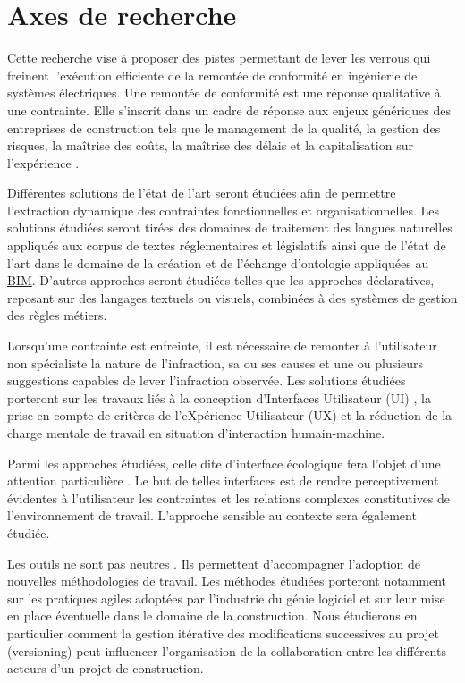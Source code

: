 \documentclass[a4paper,12pt]{article}
\begin{document}
\section{Axes de recherche}
\label{sec:org7d35508}
Cette recherche vise à proposer des pistes permettant de lever les verrous qui freinent l'exécution efficiente de la remontée de conformité en ingénierie de systèmes électriques. Une remontée de conformité est une réponse qualitative à une contrainte. Elle s’inscrit dans un cadre de réponse aux enjeux génériques des entreprises de construction tels que le management de la qualité, la gestion des risques, la maîtrise des coûts, la maîtrise des délais et la capitalisation sur l’expérience \autocite{ManagementProjetProgramme2017}.

Différentes solutions de l'état de l’art seront étudiées afin de permettre l’extraction dynamique des contraintes fonctionnelles et organisationnelles. Les solutions étudiées seront tirées des domaines de traitement des langues naturelles appliqués aux corpus de textes réglementaires et législatifs ainsi que de l'état de l’art dans le domaine de la création et de l’échange d’ontologie appliquées au \protect\hyperlink{gls-1}{\label{gls-1-use-10}BIM}. D’autres approches seront étudiées telles que les approches déclaratives, reposant sur des langages textuels ou visuels, combinées à des systèmes de gestion des règles métiers.

Lorsqu’une contrainte est enfreinte, il est nécessaire de remonter à l'utilisateur non spécialiste la nature de l’infraction, sa ou ses causes et une ou plusieurs suggestions capables de lever l’infraction observée. Les solutions étudiées porteront sur les travaux liés à la conception d’Interfaces Utilisateur (UI) \autocite{Shneiderman2016}, la prise en compte de critères de l’eXpérience Utilisateur (UX) \autocite{Nogier2020} et la réduction de la charge mentale de travail \autocite{longoHumanMentalWorkload2022a,morayMentalWorkloadIts1979a} en situation d’interaction humain-machine. 

Parmi les approches étudiées, celle dite d'interface écologique fera l’objet d’une attention particulière \autocite{Burns2004,vicenteEcologicalInterfaceDesign1992b}. Le but de telles interfaces est de rendre perceptivement évidentes à l'utilisateur les contraintes et les relations complexes constitutives de l’environnement de travail. L’approche sensible au contexte \autocite{deyUnderstandingUsingContext2001a} sera également étudiée.

Les outils ne sont pas neutres \autocite{borremansGuideConvivialTools1979a}. Ils permettent d’accompagner l’adoption de nouvelles méthodologies de travail. Les méthodes étudiées porteront notamment sur les pratiques agiles adoptées par l’industrie du génie logiciel et sur leur mise en place éventuelle dans le domaine de la construction. Nous étudierons en particulier comment la gestion itérative des modifications successives au projet (versioning) peut influencer l’organisation de la collaboration entre les différents acteurs d’un projet de construction.
\end{document}
